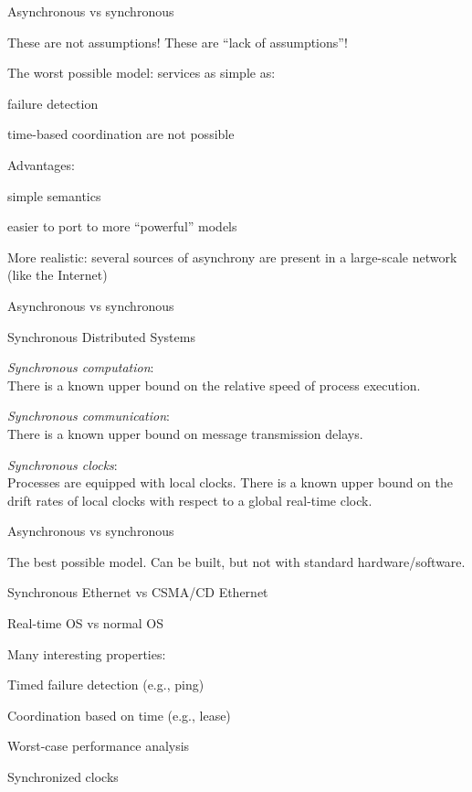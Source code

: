 \begin{frame}{Asynchronous vs synchronous}

\BIL
\item These are not assumptions! These are ``lack of assumptions''!
\item The worst possible model: services as simple as:
  \BI
  \item failure detection 
  \item time-based coordination
  \EI
  are not possible
\item Advantages:
 \BI
  \item simple semantics
  \item easier to port to more ``powerful'' models
  \item More realistic: several sources of asynchrony are present
    in a large-scale network (like the Internet)
  \EI
\EIL
\end{frame}

\begin{frame}{Asynchronous vs synchronous}

\begin{block}{Synchronous Distributed Systems }

\BI
\item {\em Synchronous computation}: \\
  There is a known upper bound on the relative speed of process execution.
\item {\em Synchronous communication}: \\
  There is a known upper bound on message transmission delays.
\item {\em Synchronous clocks}: \\
  Processes are equipped with local clocks. There is a known upper bound on
  the drift rates of local clocks with respect to a global real-time clock.
\EI
\end{block}

\end{frame}

\begin{frame}{Asynchronous vs synchronous}

\BIL
\item The best possible model. Can be built, but not with standard hardware/software.
\BI
  \item Synchronous Ethernet vs CSMA/CD Ethernet
  \item Real-time OS vs normal OS
\EI
\item Many interesting properties:
  \BI
  \item Timed failure detection (e.g., ping)
  \item Coordination based on time (e.g., lease)
  \item Worst-case performance analysis
  \item Synchronized clocks
  \EI
\EIL

\end{frame}


